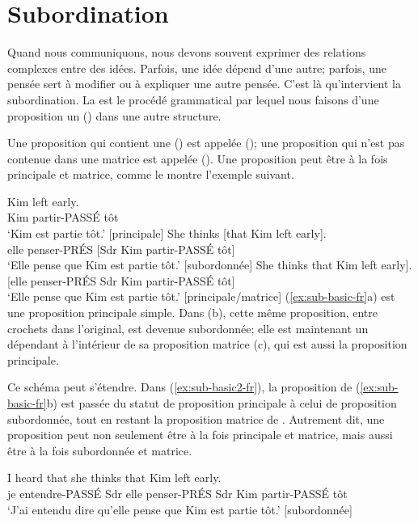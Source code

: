 \section{Subordination}\label{sec:subordination-fr}

Quand nous communiquons, nous devons souvent exprimer des relations complexes entre des idées. Parfois, une idée dépend d'une autre; parfois, une pensée sert à modifier ou à expliquer une autre pensée. C'est là qu'intervient la subordination. La  est le procédé grammatical par lequel nous faisons d'une proposition un  () dans une autre structure.

Une proposition qui contient une  () est appelée  (); une proposition qui n'est pas contenue dans une matrice est appelée  (). Une proposition peut être à la fois principale et matrice, comme le montre l'exemple suivant.

\ea \label{ex:sub-basic-fr}
    \ea \gll Kim left early.\\
        Kim partir-PASSÉ tôt\\
    \glt `Kim est partie tôt.' [principale]
    \ex \gll She thinks {[}that Kim left early{]}.\\
        elle penser-PRÉS {[}Sdr Kim partir-PASSÉ tôt{]}\\
    \glt `Elle pense que Kim est partie tôt.' [subordonnée]
    \ex \gll {[}She thinks that Kim left early{]}.\\
        {[}elle penser-PRÉS Sdr Kim partir-PASSÉ tôt{]}\\
    \glt `Elle pense que Kim est partie tôt.' [principale/matrice]
    \z
\z
(\ref{ex:sub-basic-fr}a) est une proposition principale simple. Dans (b), cette même proposition, entre crochets dans l'original, est devenue subordonnée; elle est maintenant un dépendant à l'intérieur de sa proposition matrice (c), qui est aussi la proposition principale.

Ce schéma peut s'étendre. Dans (\ref{ex:sub-basic2-fr}), la proposition de (\ref{ex:sub-basic-fr}b) est passée du statut de proposition principale à celui de proposition subordonnée, tout en restant la proposition matrice de . Autrement dit, une proposition peut non seulement être à la fois principale et matrice, mais aussi être à la fois subordonnée et matrice.

\ea\label{ex:sub-basic2-fr}
\gll I heard {\ob}that she thinks {\ob}that Kim left early{\cb}{\cb}.\\
    je entendre-PASSÉ Sdr elle penser-PRÉS Sdr Kim partir-PASSÉ tôt\\
\glt `J'ai entendu dire qu'elle pense que Kim est partie tôt.' [subordonnée]
\z

